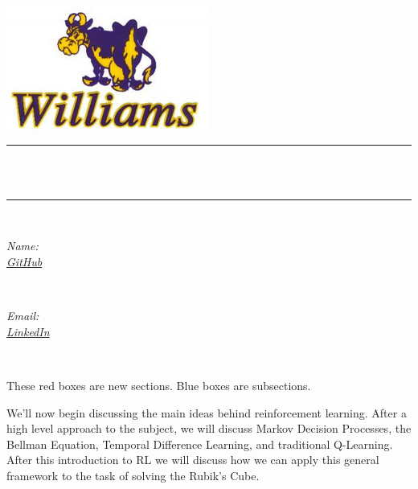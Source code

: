 \documentclass[12pt,oneside,oldfontcommands]{memoir}
\makeatletter
\theoremstyle{definition}
\def\maketitle{%
  \null
  \thispagestyle{empty}
  \begin{center}\leavevmode
       \normalfont
       \includegraphics[width=0.35\columnwidth]{williamslogo.jpg}
       \vskip 1.0cm
	\rule{\linewidth}{0.2 mm} \\[0.4 cm]
	{ \huge \bfseries \@title}\\
	\rule{\linewidth}{0.2 mm} \\[1.5 cm]
	
	\begin{minipage}{0.5\textwidth}
		\begin{flushleft} \large
			\emph{Name:} \student\\
                \href{https://github.com/jcheigh}{\emph{GitHub}}
			\end{flushleft}
			\end{minipage}~
			\begin{minipage}{0.4\textwidth}
			\begin{flushleft} \large
			\emph{Email:} \email\\        
                \href{https://www.linkedin.com/in/justin-cheigh/}{\emph{LinkedIn}}
		\end{flushleft}
	\end{minipage}\\[2 cm]
   \end{center}
   \vfill
   \null
   \small
   \emph{\ifcollab} \collaborators
   \cleardoublepage
  }
\makeatother
\begin{document}
\maketitle
\frontmatter
\let\cleardoublepage\clearpage
\mainmatter
\sloppy


\newpage
\begin{Section}[0- Introduction]
These red boxes are new sections.
\tcblower
Blue boxes are subsections. 
\end{Section}

\begin{Section}
We'll now begin discussing the main ideas behind reinforcement learning.
\tcblower
After a high level approach to the subject, we will discuss Markov Decision Processes, the Bellman Equation, Temporal Difference Learning, and traditional Q-Learning. After this introduction to RL we will discuss how we can apply this general framework to the task of solving the Rubik's Cube. \end{Section}
\end{document}
